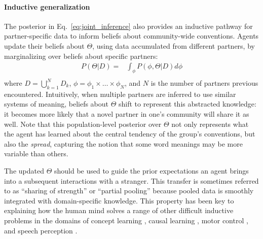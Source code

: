 \paragraph{Inductive generalization}

The posterior in Eq.~\ref{eq:joint_inference} also provides an inductive pathway for partner-specific data to inform beliefs about community-wide conventions.
Agents update their beliefs about $\Theta$, using data accumulated from different partners, by marginalizing over beliefs about specific partners:
\begin{equation}
\begin{split}
    P(\Theta | D)  = & \int_{\phi} P(\phi, \Theta | D) d\phi \\
\end{split}
\end{equation}
where $D = \bigcup_{k=1}^N D_k$, $\phi = \phi_1 \times \dots \times \phi_N$, and $N$ is the number of partners previous encountered. 
Intuitively, when multiple partners are inferred to use similar systems of meaning, beliefs about $\Theta$ shift to represent this abstracted knowledge: it becomes more likely that a novel partner in one's community will share it as well.
Note that this population-level posterior over $\Theta$ not only represents what the agent has learned about the central tendency of the group's conventions, but also the \emph{spread}, capturing the notion that some word meanings may be more variable than others.

The updated $\Theta$ should be used to guide the prior expectations an agent brings into a subsequent interactions with a stranger.
This transfer is sometimes referred to as ``sharing of strength'' or ``partial pooling'' because pooled data is smoothly integrated with domain-specific knowledge.
This property has been key to explaining how the human mind solves a range of other difficult inductive problems in the domains of concept learning \cite{KempPerforsTenenbaum07_HBM, tenenbaum_how_2011}, causal learning \cite{KempGoodmanTenenbaum10_LearningToLearn,GoodmanUllmanTenenbaum11_TheoryOfCausality},  motor control \cite{berniker2008estimating}, and speech perception \cite{kleinschmidt2015robust}.

